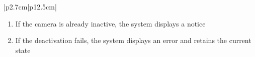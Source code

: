 \begin{table}[H]
\begin{tabular}{|p{2.7cm}|p{12.5cm}|}
\begin{minipage}[t]{\linewidth}
\begin{enumerate}[topsep=0pt,itemsep=1pt,parsep=0pt,partopsep=0pt]
                                          \item If the camera is already inactive, the system displays a notice
                                          \item If the deactivation fails, the system displays an error and retains the current
                                                state
                                      \end{enumerate}
                                  \end{minipage} \\
        \hline
    \end{tabular}
    \label{tab:admin-deactivate-camera}
\end{table}
\fi